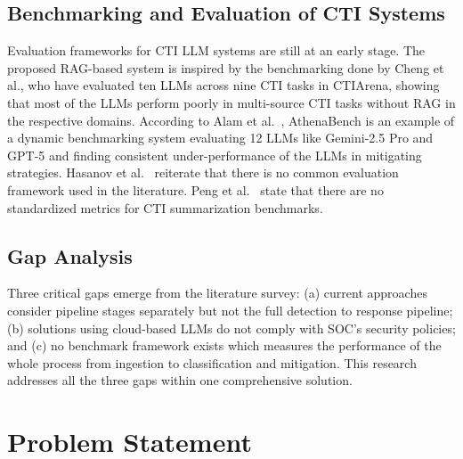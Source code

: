 \documentclass[conference]{IEEEtran}
\begin{document}
{\subsection{Benchmarking and Evaluation of CTI Systems}

Evaluation frameworks for CTI LLM systems are still at an early stage. The proposed RAG-based system is inspired by the benchmarking done by Cheng et al., who have evaluated ten LLMs across nine CTI tasks in CTIArena, showing that most of the LLMs perform poorly in multi-source CTI tasks without RAG in the respective domains. According to Alam et al.~\cite{alam2026athena}, AthenaBench is an example of a dynamic benchmarking system evaluating 12 LLMs like Gemini-2.5 Pro and GPT-5 and finding consistent under-performance of the LLMs in mitigating strategies. Hasanov et al.~\cite{hasanov2024llm} reiterate that there is no common evaluation framework used in the literature. Peng et al.~\cite{peng2024ctisum} state that there are no standardized metrics for CTI summarization benchmarks.

\subsection{Gap Analysis}

Three critical gaps emerge from the literature survey: (a) current approaches consider pipeline stages separately but not the full detection to response pipeline; (b) solutions using cloud-based LLMs do not comply with SOC’s security policies; and (c) no benchmark framework exists which measures the performance of the whole process from ingestion to classification and mitigation. This research addresses all the three gaps within one comprehensive solution.


\section{Problem Statement}
\label{sec:problem}

}
\end{document}
